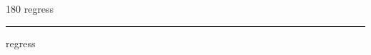 
\begin{frame}
\begin{center}
\begin{turn}{180}
{\fontsize{2.5cm}{1em}\selectfont regress}
\end{turn}
\vspace{1em}\par  
\hrule
\vspace{1em}\par  
{\fontsize{2.5cm}{1em}\selectfont regress}
\end{center}
\end{frame}
